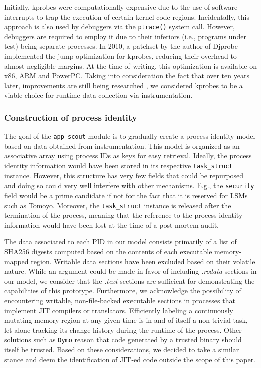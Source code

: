 Initially, kprobes were computationally expensive due to the use of software
interrupts to trap the execution of certain kernel code regions. Incidentally,
this approach is also used by debuggers via the \texttt{ptrace()} system call.
However, debuggers are required to employ it due to their inferiors (i.e.,
programs under test) being separate processes. In 2010, a patchset by the author
of Djprobe \cite{hiramatsu2007djprobe} implemented the jump optimization for
kprobes, reducing their overhead to almost negligible margins. At the time of
writing, this optimization is available on x86, ARM and PowerPC. Taking into
consideration the fact that over ten years later, improvements are still being
researched \cite{jia2024fast}, we considered kprobes to be a viable choice for
runtime data collection via instrumentation.


\subsubsection{Construction of process identity}

The goal of the \texttt{app-scout} module is to gradually create a process
identity model based on data obtained from instrumentation. This model is
organized as an associative array using process IDs as keys for easy retrieval.
Ideally, the process identity information would have been stored in its
respective \texttt{task\_struct} instance. However, this structure has very few
fields that could be repurposed and doing so could very well interfere with
other mechanisms. E.g., the \texttt{security} field would be a prime candidate
if not for the fact that it is reserved for LSMs such as Tomoyo. Moreover, the
\texttt{task\_struct} instance is released after the termination of the process,
meaning that the reference to the process identity information would have been
lost at the time of a post-mortem audit.

The data associated to each PID in our model consists primarily of a list of
SHA256 digests computed based on the contents of each executable memory-mapped
region. Writable data sections have been excluded based on their volatile
nature. While an argument could be made in favor of including \textit{.rodata}
sections in our model, we consider that the \textit{.text} sections are
sufficient for demonstrating the capabilities of this prototype. Furthermore, we
acknowledge the possibility of encountering writable, non-file-backed executable
sections in processes that implement JIT compilers or translators. Efficiently
labeling a continuously mutating memory region at any given time is in and of
itself a non-trivial task, let alone tracking its change history during the
runtime of the process. Other solutions such as \texttt{Dymo}
\cite{gilbert2011dymo} reason that code generated by a trusted binary should
itself be trusted. Based on these considerations, we decided to take a similar
stance and deem the identification of JIT-ed code outside the scope of this
paper.

